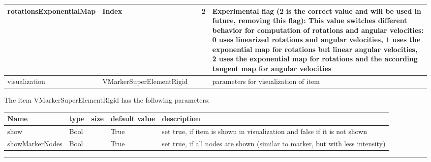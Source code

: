 \begin{center}
\begin{longtable}{| p{4.5cm} | p{2.5cm} | p{0.5cm} | p{2.5cm} | p{6cm} |}
    rotationsExponentialMap &     Index &      &     2 &     Experimental flag (2 is the correct value and will be used in future, removing this flag): This value switches different behavior for computation of rotations and angular velocities: 0 uses linearized rotations and angular velocities, 1 uses the exponential map for rotations but linear angular velocities, 2 uses the exponential map for rotations and the according tangent map for angular velocities\\ \hline
    visualization &     VMarkerSuperElementRigid &      &      &     parameters for visualization of item\\ \hline
\end{longtable}
\end{center}

\noindent The item VMarkerSuperElementRigid has the following parameters:
\begin{center}
  \footnotesize
  \begin{longtable}{| p{4.5cm} | p{2.5cm} | p{0.5cm} | p{2.5cm} | p{6cm} |}
    \hline
    \bf Name & \bf type & \bf size & \bf default value & \bf description \\ \hline
    show &     Bool &      &     True &     set true, if item is shown in visualization and false if it is not shown\\ \hline
    showMarkerNodes &     Bool &      &     True &     set true, if all nodes are shown (similar to marker, but with less intensity)\\ \hline
\end{longtable}
\end{center}
\par\noindent\rule{\textwidth}{0.4pt}
\label{description_MarkerSuperElementRigid}
